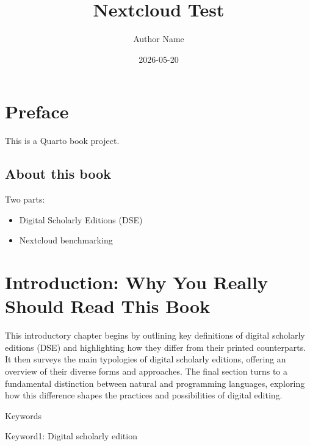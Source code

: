 \documentclass[
  letterpaper,
  DIV=11,
  numbers=noendperiod]{scrreprt}
\title{Nextcloud Test}
\author{Author Name}
\date{2026-05-20}
\providecommand{\tightlist}{%
  \setlength{\itemsep}{0pt}\setlength{\parskip}{0pt}}\usepackage{longtable,booktabs,array}
\renewcommand*\contentsname{Table of contents}
\newcommand\contentsname{Table of contents}
\begin{document}
\maketitle

\renewcommand*\contentsname{Table of contents}
{
\hypersetup{linkcolor=}
\setcounter{tocdepth}{2}
\tableofcontents
}


\chapter*{Preface}\label{preface}


This is a Quarto book project.

\section*{About this book}\label{about-this-book}


Two parts:

\begin{itemize}
\tightlist
\item
  Digital Scholarly Editions (DSE)
\item
  Nextcloud benchmarking
\end{itemize}


\chapter{Introduction: Why You Really Should Read This
Book}\label{introduction-why-you-really-should-read-this-book}

This introductory chapter begins by outlining key definitions of digital
scholarly editions (DSE) and highlighting how they differ from their
printed counterparts. It then surveys the main typologies of digital
scholarly editions, offering an overview of their diverse forms and
approaches. The final section turns to a fundamental distinction between
natural and programming languages, exploring how this difference shapes
the practices and possibilities of digital editing.

Keywords

Keyword1: Digital scholarly edition
\end{document}

